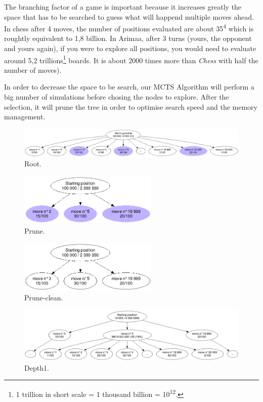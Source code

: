 The branching factor of a game is important because it increases greatly the space that has to be searched to guess what will happend multiple moves ahead. In chess after 4 moves, the number of positions evaluated are about 35\textsuperscript{4} which is roughtly equivalent to 1,8 billion. In Arimaa, after 3 turns (yours, the opponent and yours again), if you were to explore all positions, you would need to evaluate around 5,2 trillions\footnote{1 trillion in short scale = 1 thousand billion = 10\textsuperscript{12}.} boards. It is about 2000 times more than \textit{Chess} with half the number of moves).

In order to decrease the space to be search, our MCTS Algorithm will perform a big number of simulations before chosing the nodes to explore. After the selection, it will prune the tree in order to optimise search speed and the memory management.

\begin{figure}[H]
\centering
	\includegraphics[width=\textwidth]{3Methods/3.2MCTS/img/root.png}
	\caption{\label{fig:root}Root.}
\end{figure}

\begin{figure}[H]
\centering
	\includegraphics[height=2.5cm]{3Methods/3.2MCTS/img/prune.png}
	\caption{\label{fig:prune}Prune.}
\end{figure}

\begin{figure}[H]
\centering
	\includegraphics[height=2.5cm]{3Methods/3.2MCTS/img/prune-clean.png}
	\caption{\label{fig:prune-clean}Prune-clean.}
\end{figure}

\begin{figure}[H]
\centering
	\includegraphics[width=\textwidth]{3Methods/3.2MCTS/img/depth1.png}
	\caption{\label{fig:depth1}Depth1.}
\end{figure}

